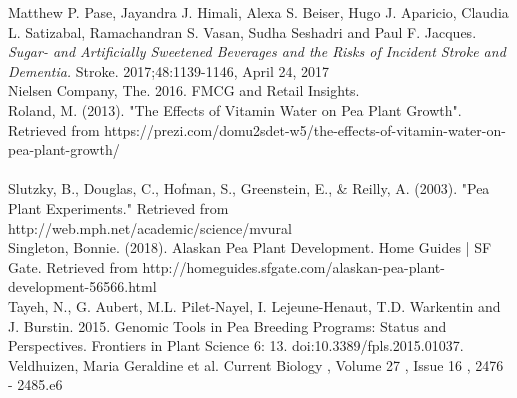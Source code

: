 \documentclass[1p,12pt]{elsarticle}\usepackage[]{graphicx}\usepackage[]{color}
\begin{document}
Matthew P. Pase, Jayandra J. Himali, Alexa S. Beiser, Hugo J. Aparicio, Claudia L. Satizabal, Ramachandran S. Vasan, Sudha Seshadri and Paul F. Jacques. 
\textit{Sugar- and Artificially Sweetened Beverages and the Risks of Incident Stroke and Dementia.} 
Stroke. 2017;48:1139-1146, April 24, 2017
~\\

Nielsen Company, The. 2016. FMCG and Retail Insights.
~\\  

Roland, M. (2013). "The Effects of Vitamin Water on Pea Plant Growth". Retrieved from https://prezi.com/domu2sdet-w5/the-effects-of-vitamin-water-on-pea-plant-growth/ \\ 
~ \\ 

Slutzky, B., Douglas, C., Hofman, S., Greenstein, E., & Reilly, A. (2003). "Pea Plant Experiments." Retrieved from \\http://web.mph.net/academic/science/mvural
~ \\ 

Singleton, Bonnie. (2018). Alaskan Pea Plant Development. Home Guides | SF Gate. Retrieved from http://homeguides.sfgate.com/alaskan-pea-plant-development-56566.html
~\\

Tayeh, N., G. Aubert, M.L. Pilet-Nayel, I. Lejeune-Henaut, T.D. Warkentin and J.
Burstin. 2015. Genomic Tools in Pea Breeding Programs: Status and Perspectives.
Frontiers in Plant Science 6: 13. doi:10.3389/fpls.2015.01037.
~\\  

Veldhuizen, Maria Geraldine et al.
Current Biology , Volume 27 , Issue 16 , 2476 - 2485.e6
~\\
\end{document}
